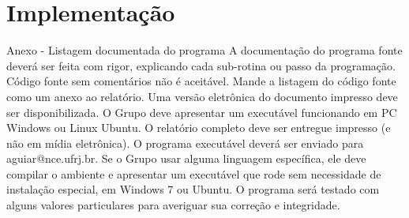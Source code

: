 
\chapter{Implementação}
Anexo - Listagem documentada do programa
A documentação do programa fonte deverá ser feita com rigor, explicando cada sub-rotina
ou passo da programação. Código fonte sem comentários não é aceitável. Mande a listagem
do código fonte como um anexo ao relatório. Uma versão eletrônica do documento
impresso deve ser disponibilizada.
O Grupo deve apresentar um executável funcionando em PC Windows ou Linux Ubuntu.
O relatório completo deve ser entregue impresso (e não em mídia eletrônica).
O programa executável deverá ser enviado para aguiar@nce.ufrj.br.
Se o Grupo usar alguma linguagem específica, ele deve compilar o ambiente e apresentar
um executável que rode sem necessidade de instalação especial, em Windows 7 ou Ubuntu.
O programa será testado com alguns valores particulares para averiguar sua correção e
integridade.
